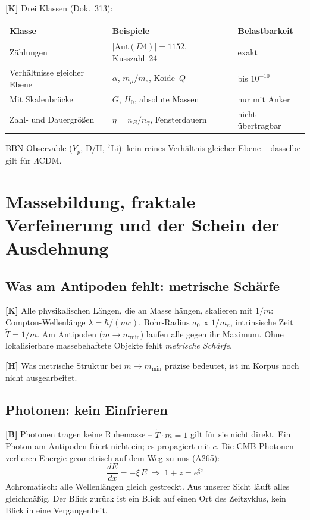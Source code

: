 \textbf{[K]} Drei Klassen (Dok.~313):

\begin{center}
	\small
	\begin{tabular}{p{3.2cm}p{4cm}p{3cm}}
		\toprule
		Klasse & Beispiele & Belastbarkeit \\
		\midrule
		Zählungen & $|\text{Aut}(D4)| = 1152$, Kusszahl~24 & exakt \\
		Verhältnisse gleicher Ebene & $\alpha$, $m_\mu/m_e$, Koide~$Q$ &
		bis $10^{-10}$ \\
		Mit Skalenbrücke & $G$, $H_0$, absolute Massen & nur mit Anker \\
		Zahl- und Dauergrößen & $\eta = n_B/n_\gamma$, Fensterdauern &
		nicht übertragbar \\
		\bottomrule
	\end{tabular}
\end{center}

BBN-Observable ($Y_p$, D/H, ${}^7$Li): kein reines Verhältnis
gleicher Ebene – dasselbe gilt für $\Lambda$CDM.

\section{Massebildung, fraktale Verfeinerung und der Schein der Ausdehnung}

\subsection{Was am Antipoden fehlt: metrische Schärfe}

\textbf{[K]} Alle physikalischen Längen, die an Masse hängen, skalieren
mit $1/m$: Compton-Wellenlänge $\bar\lambda = \hbar/(mc)$,
Bohr-Radius $a_0 \propto 1/m_e$, intrinsische Zeit $\tilde{T} = 1/m$.
Am Antipoden ($m \to m_\text{min}$) laufen alle gegen ihr Maximum.
Ohne lokalisierbare massebehaftete Objekte fehlt \emph{metrische Schärfe}.

\textbf{[H]} Was metrische Struktur bei $m \to m_\text{min}$ präzise
bedeutet, ist im Korpus noch nicht ausgearbeitet.

\subsection{Photonen: kein Einfrieren}

\textbf{[B]} Photonen tragen keine Ruhemasse – $\tilde{T} \cdot m = 1$
gilt für sie nicht direkt. Ein Photon am Antipoden friert nicht ein;
es propagiert mit $c$. Die CMB-Photonen verlieren Energie geometrisch
auf dem Weg zu uns (A265):
\[
\frac{dE}{dx} = -\xi\,E
\;\Rightarrow\;
1 + z = e^{\xi x}
\]
Achromatisch: alle Wellenlängen gleich gestreckt.
Aus unserer Sicht läuft alles gleichmäßig. Der Blick zurück ist ein
Blick auf einen Ort des Zeitzyklus, kein Blick in eine Vergangenheit.

